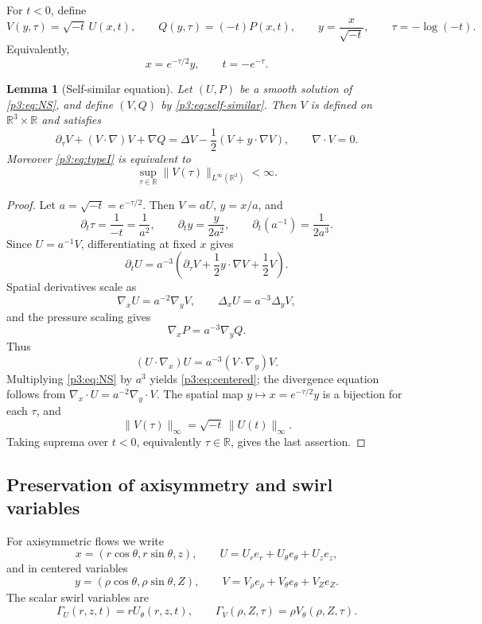 \documentclass[11pt]{amsart}
\theoremstyle{plain}
\newtheorem{lemma}[lemma]{Lemma}
\theoremstyle{definition}
\theoremstyle{remark}
\numberwithin{equation}{section}
\begin{document}
For \(t<0\), define
\begin{equation}\label{p3:eq:self-similar}
   V(y,\tau)=\sqrt{-t}\,U(x,t),\qquad
   Q(y,\tau)=(-t)P(x,t),\qquad
   y=\frac{x}{\sqrt{-t}},\qquad
   \tau=-\log(-t).
\end{equation}
Equivalently,
\[
   x=e^{-\tau/2}y,\qquad t=-e^{-\tau}.
\]

\begin{lemma}[Self-similar equation]\label{p3:lem:self-similar-equation}
Let \((U,P)\) be a smooth solution of \eqref{p3:eq:NS}, and define \((V,Q)\) by
\eqref{p3:eq:self-similar}.  Then \(V\) is defined on
\(\mathbb R^3\times\mathbb R\) and satisfies
\begin{equation}\label{p3:eq:centered}
   \partial_\tau V+(V\cdot\nabla)V+\nabla Q
   =
   \Delta V-\frac12(V+y\cdot\nabla V),
   \qquad \nabla\cdot V=0.
\end{equation}
Moreover \eqref{p3:eq:typeI} is equivalent to
\[
   \sup_{\tau\in\mathbb R}
   \|V(\tau)\|_{L^\infty(\mathbb R^3)}<\infty .
\]
\end{lemma}

\begin{proof}
Let \(a=\sqrt{-t}=e^{-\tau/2}\).  Then \(V=aU\), \(y=x/a\), and
\[
   \partial_t\tau=\frac1{-t}=\frac1{a^2},
   \qquad
   \partial_t y=\frac{y}{2a^2},
   \qquad
   \partial_t(a^{-1})=\frac1{2a^3}.
\]
Since \(U=a^{-1}V\), differentiating at fixed \(x\) gives
\[
   \partial_tU
   =
   a^{-3}
   \left(
      \partial_\tau V+\frac12 y\cdot\nabla V+\frac12V
   \right).
\]
Spatial derivatives scale as
\[
   \nabla_xU=a^{-2}\nabla_yV,\qquad
   \Delta_xU=a^{-3}\Delta_yV,
\]
and the pressure scaling gives
\[
   \nabla_xP=a^{-3}\nabla_yQ.
\]
Thus
\[
   (U\cdot\nabla_x)U=a^{-3}(V\cdot\nabla_y)V.
\]
Multiplying \eqref{p3:eq:NS} by \(a^3\) yields \eqref{p3:eq:centered}; the
divergence equation follows from
\(\nabla_x\cdot U=a^{-2}\nabla_y\cdot V\).  The spatial map
\(y\mapsto x=e^{-\tau/2}y\) is a bijection for each \(\tau\), and
\[
   \|V(\tau)\|_\infty
   =
   \sqrt{-t}\,\|U(t)\|_\infty .
\]
Taking suprema over \(t<0\), equivalently \(\tau\in\mathbb R\), gives the
last assertion.
\end{proof}

\subsection{Preservation of axisymmetry and swirl variables}

For axisymmetric flows we write
\[
   x=(r\cos\theta,r\sin\theta,z),\qquad
   U=U_re_r+U_\theta e_\theta+U_ze_z,
\]
and in centered variables
\[
   y=(\rho\cos\theta,\rho\sin\theta,Z),\qquad
   V=V_\rho e_\rho+V_\theta e_\theta+V_Ze_Z.
\]
The scalar swirl variables are
\[
   \Gamma_U(r,z,t)=rU_\theta(r,z,t),\qquad
   \Gamma_V(\rho,Z,\tau)=\rho V_\theta(\rho,Z,\tau).
\]
\end{document}
